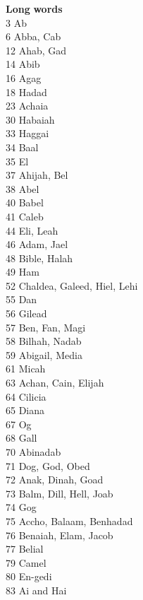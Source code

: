 \noindent
\textbf{Long} \quad \textbf{words} \\
3 \quad Ab\\
6 \quad Abba, Cab\\
12 \quad Ahab, Gad\\
14 \quad Abib\\
16 \quad Agag\\
18 \quad Hadad\\
23 \quad Achaia\\
30 \quad Habaiah\\
33 \quad Haggai\\
34 \quad Baal\\
35 \quad El\\
37 \quad Ahijah, Bel\\
38 \quad Abel\\
40 \quad Babel\\
41 \quad Caleb\\
44 \quad Eli, Leah\\
46 \quad Adam, Jael\\
48 \quad Bible, Halah\\
49 \quad Ham\\
52 \quad Chaldea, Galeed, Hiel, Lehi\\
55 \quad Dan\\
56 \quad Gilead\\
57 \quad Ben, Fan, Magi\\
58 \quad Bilhah, Nadab\\
59 \quad Abigail, Media\\
61 \quad Micah\\
63 \quad Achan, Cain, Elijah\\
64 \quad Cilicia\\
65 \quad Diana\\
67 \quad Og\\
68 \quad Gall\\
70 \quad Abinadab\\
71 \quad Dog, God, Obed\\
72 \quad Anak, Dinah, Goad\\
73 \quad Balm, Dill, Hell, Joab\\
74 \quad Gog\\
75 \quad Accho, Balaam, Benhadad\\
76 \quad Benaiah, Elam, Jacob\\
77 \quad Belial\\
79 \quad Camel\\
80 \quad En-gedi\\
83 \quad Ai and Hai\\
